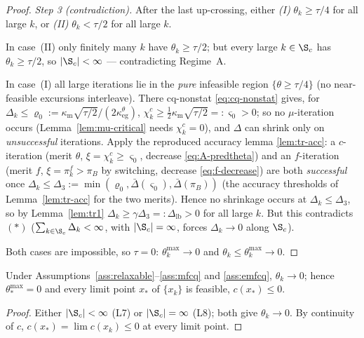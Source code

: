 \begin{proof}
  \emph{Step 3 (contradiction).} After the last up-crossing, either
  \emph{(I)} $\theta_k\ge\tau/4$ for all large $k$, or \emph{(II)} $\theta_k<\tau/2$
  for all large $k$.

  In case~(II) only finitely many $k$ have $\theta_k\ge\tau/2$; but every large
  $k\in\S_c$ has $\theta_k\ge\tau/2$, so $|\S_c|<\infty$ --- contradicting Regime~A.

  In case~(I) all large iterations lie in the \emph{pure} infeasible region
  $\{\theta\ge\tau/4\}$ (no near-feasible excursions interleave). There
  cq-nonstat \eqref{eq:cq-nonstat} gives, for $\Delta_k\le\varrho_0:=\kappa_{\mathrm m}\sqrt{\tau/2}/(2\kappa_{\mathrm{eg}}^\theta)$,
  $\chi_k^c\ge\tfrac12\kappa_{\mathrm m}\sqrt{\tau/2}=:\varsigma_0>0$; so no $\mu$-iteration
  occurs (Lemma~\ref{lem:mu-critical} needs $\chi_k^c=0$), and $\Delta$ can shrink only
  on \emph{unsuccessful} iterations. Apply the reproduced accuracy lemma
  \ref{lem:tr-acc}: a $c$-iteration (merit $\theta$, $\xi=\chi_k^c\ge\varsigma_0$,
  decrease \eqref{eq:A-predtheta}) and an $f$-iteration (merit $f$, $\xi=\pi_k^f>\pi_B$
  by switching, decrease \eqref{eq:f-decrease}) are both \emph{successful} once
  $\Delta_k\le\Delta_3:=\min(\varrho_0,\bar\Delta(\varsigma_0),\bar\Delta(\pi_B))$
  (the accuracy thresholds of Lemma~\ref{lem:tr-acc} for the two merits). Hence no
  shrinkage occurs at $\Delta_k\le\Delta_3$, so by Lemma~\ref{lem:tr1}
  $\Delta_k\ge\gamma\Delta_3=:\Delta_{\mathrm{lb}}>0$ for all large $k$. But this
  contradicts $(\ast)$ ($\sum_{k\in\S_c}\Delta_k<\infty$, with $|\S_c|=\infty$, forces
  $\Delta_k\to0$ along $\S_c$).

  Both cases are impossible, so $\tau=0$: $\theta_k^{\max}\to0$ and
  $\theta_k\le\theta_k^{\max}\to0$.
\end{proof}

\begin{theorem}[T1 --- feasibility]
  \label{thm:T1}
  Under Assumptions~\ref{ass:relaxable}--\ref{ass:mfcq} and \ref{ass:emfcq},
  $\theta_k\to0$; hence $\theta_*^{\max}=0$ and every limit point $x_*$ of
  $\{x_k\}$ is feasible, $c(x_*)\le0$.
\end{theorem}
\begin{proof}
  Either $|\S_c|<\infty$ (L7) or $|\S_c|=\infty$ (L8); both give $\theta_k\to0$. By
  continuity of $c$, $c(x_*)=\lim c(x_k)\le0$ at every limit point.
\end{proof}

